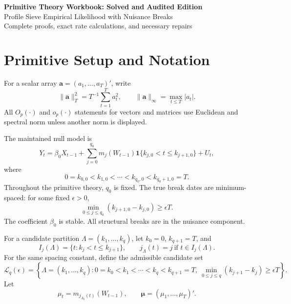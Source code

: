\documentclass[12pt]{article}
\numberwithin{equation}{section}
\theoremstyle{definition}
\newcommand{\ind}{\mathbf 1}
\begin{document}
\begin{center}
{\Large\bf Primitive Theory Workbook: Solved and Audited Edition}\\[6pt]
{\large Profile Sieve Empirical Likelihood with Nuisance Breaks}\\[6pt]
{\normalsize Complete proofs, exact rate calculations, and necessary repairs}
\end{center}

\tableofcontents
\newpage

\section{Primitive Setup and Notation}

For a scalar array \(\bm a=(a_1,\ldots,a_T)'\), write
\[
    \|\bm a\|_T^2=T^{-1}\sum_{t=1}^T a_t^2,
    \qquad
    \|\bm a\|_\infty=\max_{t\leq T}|a_t|.
\]
All \(O_p(\cdot)\) and \(o_p(\cdot)\) statements for vectors and matrices use Euclidean and spectral norm unless another norm is displayed.

The maintained null model is
\begin{equation}
    Y_t
    =
    \beta_0X_{t-1}
    +
    \sum_{j=0}^{q_0}
    m_j(W_{t-1})\ind\{k_{j,0}<t\leq k_{j+1,0}\}
    +
    U_t,
    \label{eq:primitive-model}
\end{equation}
where
\[
    0=k_{0,0}<k_{1,0}<\cdots<k_{q_0,0}<k_{q_0+1,0}=T.
\]
Throughout the primitive theory, \(q_0\) is fixed. The true break dates are minimum-spaced: for some fixed \(\epsilon>0\),
\[
    \min_{0\leq j\leq q_0}(k_{j+1,0}-k_{j,0})\geq \epsilon T.
\]
The coefficient \(\beta_0\) is stable. All structural breaks are in the nuisance component.

For a candidate partition \(\Lambda=(k_1,\ldots,k_q)\), let \(k_0=0\), \(k_{q+1}=T\), and
\[
    I_j(\Lambda)=\{t:k_j<t\leq k_{j+1}\},
    \qquad
    j_\Lambda(t)=j\ \text{if }t\in I_j(\Lambda).
\]
For the same spacing constant, define the admissible candidate set
\[
    \mathcal L_q(\epsilon)
    =
    \left\{\Lambda=(k_1,\ldots,k_q):
    0=k_0<k_1<\cdots<k_q<k_{q+1}=T,\ 
    \min_{0\leq j\leq q}(k_{j+1}-k_j)\geq \epsilon T
    \right\}.
\]
Let
\[
    \mu_t=m_{j_{\Lambda_0}(t)}(W_{t-1}),
    \qquad
    \bm\mu=(\mu_1,\ldots,\mu_T)'.
\]
\end{document}
